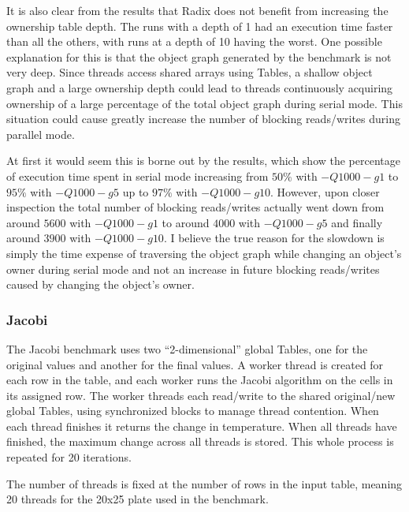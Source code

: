 It is also clear from the results that Radix does not benefit from
increasing the ownership table depth.  The runs with a depth of 1 had
an execution time faster than all the others, with runs at a depth of
10 having the worst.  One possible explanation for this is that the
object graph generated by the benchmark is not very deep.  Since
threads access shared arrays using Tables, a shallow object graph and
a large ownership depth could lead to threads continuously acquiring
ownership of a large percentage of the total object graph during
serial mode.  This situation could cause greatly increase the number
of blocking reads/writes during parallel mode.

At first it would seem this is borne out by the results, which show
the percentage of execution time spent in serial mode increasing from
$50\%$ with $-Q1000 -g1$ to $95\%$ with $-Q1000 -g5$ up to $97\%$ with
$-Q1000 -g10$.  However, upon closer inspection the total number of
blocking reads/writes actually went down from around $5600$ with
$-Q1000 -g1$ to around $4000$ with $-Q1000 -g5$ and finally around
$3900$ with $-Q1000 -g10$.  I believe the true reason for the slowdown
is simply the time expense of traversing the object graph while
changing an object's owner during serial mode and not an increase in
future blocking reads/writes caused by changing the object's owner.

\subsubsection{Jacobi}

The Jacobi benchmark uses two ``2-dimensional'' global Tables, one for
the original values and another for the final values.  A worker thread
is created for each row in the table, and each worker runs the Jacobi
algorithm on the cells in its assigned row.  The worker threads each
read/write to the shared original/new global Tables, using
synchronized blocks to manage thread contention.  When each thread
finishes it returns the change in temperature.  When all threads have
finished, the maximum change across all threads is stored.  This whole
process is repeated for 20 iterations.

The number of threads is fixed at the number of rows in the input
table, meaning 20 threads for the 20x25 plate used in the benchmark.

